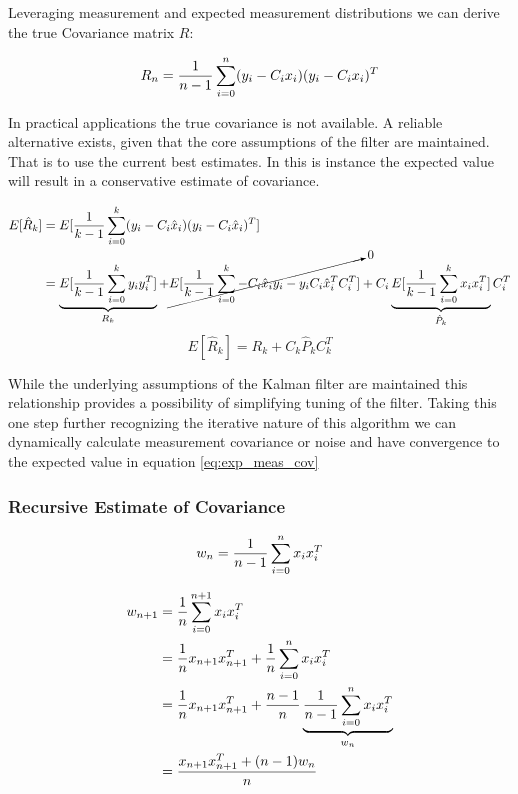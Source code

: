 \documentclass[a4paper]{article}
\begin{document}
	Leveraging measurement and expected measurement distributions we can derive the true Covariance matrix $R$:

	\begin{equation}
		R_n = {1 \over n - 1} \displaystyle\sum_{i=0} ^{n} (y_i - C_i x_i) (y_i - C_i x_i)^T
	\end{equation}

	In practical applications the true covariance is not available. A reliable alternative exists, given that the core assumptions of the filter are maintained. That is to use the current best estimates. In this is instance the expected value will result in a conservative estimate of covariance.

	\begin{align*}
		E[\hat{R}_k] &= E[{1 \over k - 1} \displaystyle\sum_{i=0} ^{k} (y_i - C_i \hat{x}_i) (y_i - C_i \hat{x}_i)^T]\\
		&= \underbrace{E[{1 \over k - 1} \displaystyle\sum_{i=0} ^{k} y_iy_i^T]}_{R_k} + \cancelto{0}{E[{1 \over k - 1} \displaystyle\sum_{i=0} ^{k} -C_i \hat{x}_i y_i - y_i C_i \hat{x}_i^T C_i^T]} + C_i \underbrace{E[{1 \over k - 1} \displaystyle\sum_{i=0}^{k} x_ix_i^T]}_{\hat{P}_k} C_i^T\\
	\end{align*}
	\begin{equation}
		E[\hat{R}_k] = R_k + C_k \hat{P}_k C_k^T
		\label{eq:exp_meas_cov}
	\end{equation}

	While the underlying assumptions of the Kalman filter are maintained this relationship provides a possibility of simplifying tuning of the filter. Taking this one step further recognizing the iterative nature of this algorithm we can dynamically calculate measurement covariance or noise and have convergence to the expected value in equation \ref{eq:exp_meas_cov}

	\subsubsection{Recursive Estimate of Covariance}

	\begin{equation}
		w_n = {1 \over n - 1} \displaystyle\sum_{i=0} ^{n} x_ix_i^T\\
	\end{equation}

	\begin{align*}
		w_{n+1} &= {1 \over n} \displaystyle\sum_{i=0} ^{n+1} x_ix_i^T\\
		&= {1 \over n} x_{n+1}x_{n+1}^T + {1 \over n} \displaystyle\sum_{i=0} ^{n} x_ix_i^T\\
		&= {1 \over n} x_{n+1}x_{n+1}^T + {n-1 \over n} \underbrace{{1 \over n -1} \displaystyle\sum_{i=0} ^{n} x_ix_i^T}_{w_n}\\
		&= {x_{n+1}x_{n+1}^T + (n - 1) w_n \over n}\\
	\end{align*}
\end{document}
